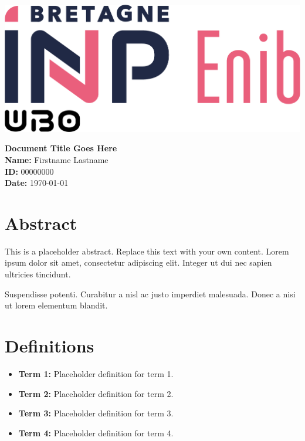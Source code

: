 \documentclass{article}
\begin{document}
\noindent
\begin{minipage}[t]{0.3\textwidth}
  \vspace{0pt} %
  \includegraphics[width=\linewidth]{enib_inp.png} %
\end{minipage}%
\hfill
\begin{minipage}[t]{0.65\textwidth}
  \vspace{0pt} %
  \raggedright
  \Large \textbf{Document Title Goes Here} \\
  \vspace{0.3cm}
  \large
  \textbf{Name:} Firstname Lastname \\ 
  \textbf{ID:} 00000000 \\
  \textbf{Date:} \today
\end{minipage}

\vspace{1cm} %

\section*{Abstract}

This is a placeholder abstract. Replace this text with your own content. Lorem ipsum dolor sit amet, consectetur adipiscing elit. Integer ut dui nec sapien ultricies tincidunt.  

Suspendisse potenti. Curabitur a nisl ac justo imperdiet malesuada. Donec a nisi ut lorem elementum blandit.

\section*{Definitions}

\begin{itemize}
    \item \textbf{Term 1:} Placeholder definition for term 1.
    \item \textbf{Term 2:} Placeholder definition for term 2.
    \item \textbf{Term 3:} Placeholder definition for term 3.
    \item \textbf{Term 4:} Placeholder definition for term 4.
\end{itemize}
\end{document}

